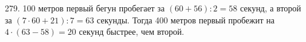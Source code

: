 279. 100 метров первый бегун пробегает за $(60+56):2=58$ секунд, а второй за $(7\cdot60+21):7=63$ секунды. Тогда 400 метров первый пробежит на $4\cdot(63-58)=20$ секунд быстрее, чем второй.\\
